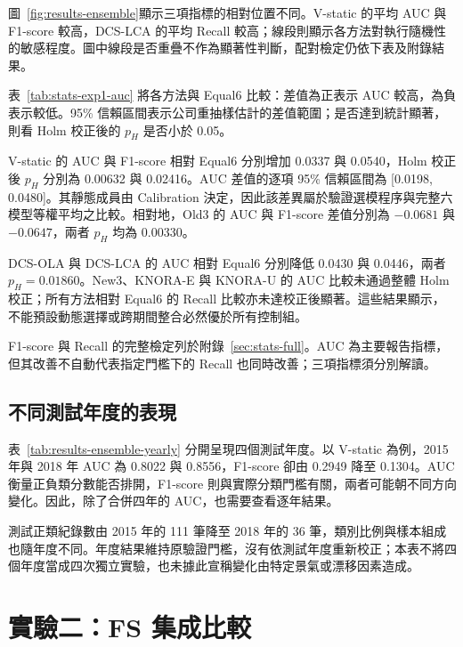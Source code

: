 圖~\ref{fig:results-ensemble}顯示三項指標的相對位置不同。V-static 的平均 AUC 與 F1-score 較高，DCS-LCA 的平均 Recall 較高；線段則顯示各方法對執行隨機性的敏感程度。圖中線段是否重疊不作為顯著性判斷，配對檢定仍依下表及附錄結果。

表~\ref{tab:stats-exp1-auc} 將各方法與 Equal6 比較：差值為正表示 AUC 較高，為負表示較低。95\% 信賴區間表示公司重抽樣估計的差值範圍；是否達到統計顯著，則看 Holm 校正後的 \(p_H\) 是否小於 0.05。



V-static 的 AUC 與 F1-score 相對 Equal6 分別增加 0.0337 與 0.0540，Holm 校正後 \(p_H\) 分別為 0.00632 與 0.02416。AUC 差值的逐項 95\% 信賴區間為 [0.0198, 0.0480]。其靜態成員由 Calibration 決定，因此該差異屬於驗證選模程序與完整六模型等權平均之比較。相對地，Old3 的 AUC 與 F1-score 差值分別為 \(-0.0681\) 與 \(-0.0647\)，兩者 \(p_H\) 均為 0.00330。

DCS-OLA 與 DCS-LCA 的 AUC 相對 Equal6 分別降低 0.0430 與 0.0446，兩者 \(p_H=0.01860\)。New3、KNORA-E 與 KNORA-U 的 AUC 比較未通過整體 Holm 校正；所有方法相對 Equal6 的 Recall 比較亦未達校正後顯著。這些結果顯示，不能預設動態選擇或跨期間整合必然優於所有控制組。

F1-score 與 Recall 的完整檢定列於附錄~\ref{sec:stats-full}。AUC 為主要報告指標，但其改善不自動代表指定門檻下的 Recall 也同時改善；三項指標須分別解讀。

\subsection{不同測試年度的表現}



表~\ref{tab:results-ensemble-yearly} 分開呈現四個測試年度。以 V-static 為例，2015 年與 2018 年 AUC 為 0.8022 與 0.8556，F1-score 卻由 0.2949 降至 0.1304。AUC 衡量正負類分數能否排開，F1-score 則與實際分類門檻有關，兩者可能朝不同方向變化。因此，除了合併四年的 AUC，也需要查看逐年結果。

測試正類紀錄數由 2015 年的 111 筆降至 2018 年的 36 筆，類別比例與樣本組成也隨年度不同。年度結果維持原驗證門檻，沒有依測試年度重新校正；本表不將四個年度當成四次獨立實驗，也未據此宣稱變化由特定景氣或漂移因素造成。

\section{實驗二：FS 集成比較}\label{sec:results-experiment2}

